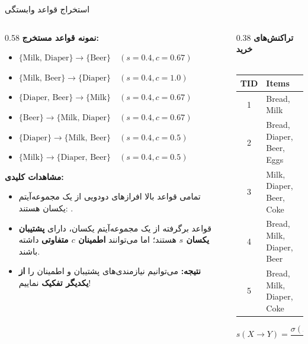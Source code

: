 \begin{frame}{استخراج قواعد وابستگی}{}
\begin{columns}[T,onlytextwidth]
\begin{column}{0.58\textwidth}
\textbf{\small نمونه قواعد مستخرج:}
\begin{latin}
\footnotesize
\begin{itemize}\setlength{\itemsep}{1pt}
    \item $\{\text{Milk, Diaper}\} \to \{\text{Beer}\} \quad (s=0.4, c=0.67)$
    \item $\{\text{Milk, Beer}\} \to \{\text{Diaper}\} \quad (s=0.4, c=1.0)$
    \item $\{\text{Diaper, Beer}\} \to \{\text{Milk}\} \quad (s=0.4, c=0.67)$
    \item $\{\text{Beer}\} \to \{\text{Milk, Diaper}\} \quad (s=0.4, c=0.67)$
    \item $\{\text{Diaper}\} \to \{\text{Milk, Beer}\} \quad (s=0.4, c=0.5)$
    \item $\{\text{Milk}\} \to \{\text{Diaper, Beer}\} \quad (s=0.4, c=0.5)$
\end{itemize}
\end{latin}

\vspace{0.1cm}
\textbf{\small مشاهدات کلیدی:}
\begin{itemize}\footnotesize\setlength{\itemsep}{2pt}
    \item تمامی قواعد بالا افرازهای دودویی از یک مجموعه‌آیتم یکسان هستند: .
    \item قواعد برگرفته از یک مجموعه‌آیتم یکسان، دارای \textbf{پشتیبان یکسان $s$} هستند؛ اما می‌توانند \textbf{اطمینان $c$ متفاوتی} داشته باشند.
    \item \alert{\textbf{نتیجه:}} می‌توانیم نیازمندی‌های پشتیبان و اطمینان را \textbf{از یکدیگر تفکیک} نماییم!
\end{itemize}
\end{column}%
\begin{column}{0.38\textwidth}
\centering
\textbf{\small تراکنش‌های خرید}\\[1pt]
{\scriptsize{}}\\[3pt]
\begin{latin}
\fontsize{7.5}{9.5}\selectfont
\begin{tabular}{|c|l|}
\hline
\rowcolor{mannheimblue!15}
\textbf{TID} & \textbf{Items} \\ \hline
1 & Bread, Milk \\ \hline
2 & Bread, Diaper, Beer, Eggs \\ \hline
3 & Milk, Diaper, Beer, Coke \\ \hline
4 & Bread, Milk, Diaper, Beer \\ \hline
5 & Bread, Milk, Diaper, Coke \\ \hline
\end{tabular}

\vspace{0.3cm}
\[
s(X \to Y) = \frac{\sigma(X \cup Y)}{|T|}
\]
\end{latin}
\end{column}
\end{columns}
\end{frame}
